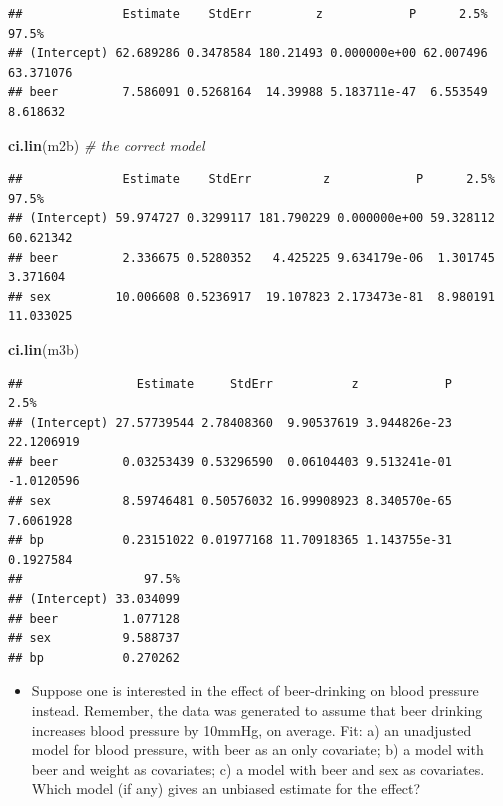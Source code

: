 \documentclass[
]{book}
\newenvironment{Shaded}{\begin{snugshade}}{\end{snugshade}}
\newcommand{\CommentTok}[1]{\textcolor[rgb]{0.56,0.35,0.01}{\textit{#1}}}
\newcommand{\FunctionTok}[1]{\textcolor[rgb]{0.13,0.29,0.53}{\textbf{#1}}}
\newcommand{\NormalTok}[1]{#1}
\providecommand{\tightlist}{%
  \setlength{\itemsep}{0pt}\setlength{\parskip}{0pt}}
\theoremstyle{definition}
\theoremstyle{definition}
\theoremstyle{definition}
\theoremstyle{definition}
\theoremstyle{remark}
\begin{document}
\begin{verbatim}
##              Estimate    StdErr         z            P      2.5%     97.5%
## (Intercept) 62.689286 0.3478584 180.21493 0.000000e+00 62.007496 63.371076
## beer         7.586091 0.5268164  14.39988 5.183711e-47  6.553549  8.618632
\end{verbatim}

\begin{Shaded}
\begin{Highlighting}[]
\FunctionTok{ci.lin}\NormalTok{(m2b) }\CommentTok{\# the correct model}
\end{Highlighting}
\end{Shaded}

\begin{verbatim}
##              Estimate    StdErr          z            P      2.5%     97.5%
## (Intercept) 59.974727 0.3299117 181.790229 0.000000e+00 59.328112 60.621342
## beer         2.336675 0.5280352   4.425225 9.634179e-06  1.301745  3.371604
## sex         10.006608 0.5236917  19.107823 2.173473e-81  8.980191 11.033025
\end{verbatim}

\begin{Shaded}
\begin{Highlighting}[]
\FunctionTok{ci.lin}\NormalTok{(m3b)}
\end{Highlighting}
\end{Shaded}

\begin{verbatim}
##                Estimate     StdErr           z            P       2.5%
## (Intercept) 27.57739544 2.78408360  9.90537619 3.944826e-23 22.1206919
## beer         0.03253439 0.53296590  0.06104403 9.513241e-01 -1.0120596
## sex          8.59746481 0.50576032 16.99908923 8.340570e-65  7.6061928
## bp           0.23151022 0.01977168 11.70918365 1.143755e-31  0.1927584
##                 97.5%
## (Intercept) 33.034099
## beer         1.077128
## sex          9.588737
## bp           0.270262
\end{verbatim}

\begin{itemize}
\tightlist
\item
  Suppose one is interested in the effect of beer-drinking on blood pressure instead. Remember, the data was generated to assume that beer drinking increases blood pressure by 10mmHg, on average. Fit: a) an unadjusted model for blood pressure, with beer as an only covariate; b) a model with beer and weight as covariates; c) a model with beer and sex as covariates. Which model (if any) gives an unbiased estimate for the effect?
\end{itemize}
\end{document}
